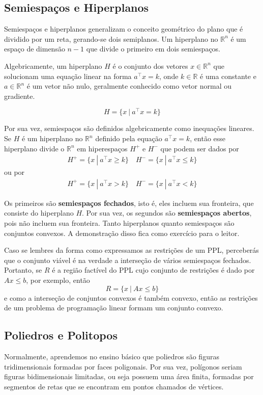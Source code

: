 \subsection{Semiespaços e Hiperplanos}
Semiespaços e hiperplanos generalizam o conceito geométrico do plano que é dividido por um reta, gerando-se dois semiplanos. Um hiperplano no $\mathbb{R}^n$ é um espaço de dimensão $n-1$ que divide o primeiro em dois semiespaços. 

Algebricamente, um hiperplano $H$ é o conjunto dos vetores $x \in \mathbb{R}^n$ que solucionam uma equação linear na forma $a^\top x = k$, onde $k \in \mathbb{R}$ é uma constante e $a \in \mathbb{R}^n$ é um vetor não nulo, geralmente conhecido como vetor normal ou gradiente.

\begin{equation*}
	H = \{x\ |\ a^\intercal x = k\}
\end{equation*} 

Por sua vez, semiespaços são definidos algebricamente como inequações lineares. Se $H$ é um hiperplano no $\mathbb{R}^n$ definido pela equação $a^\intercal x = k$, então esse hiperplano divide o $\mathbb{R}^n$ em hiperespaços $H^+$ e $H^-$ que podem ser dados por
\begin{align*}
	H^+ = \{x \ |\ a^\intercal x  \geq k\} \quad
	H^- = \{x \ |\ a^\intercal x  \leq k\} 
\end{align*}
ou por
\begin{align*}
	H^+ = \{x \ |\ a^\intercal x  > k\} \quad
	H^- = \{x \ |\ a^\intercal x  < k\} 
\end{align*}

Os primeiros são \textbf{semiespaços fechados}, isto é, eles incluem sua fronteira, que consiste do hiperplano $H$. Por sua vez, os segundos são \textbf{semiespaços abertos}, pois não incluem sua fronteira. Tanto hiperplanos quanto semiespaços são conjuntos convexos. A demonstração disso fica como exercício para o leitor.

Caso se lembres da forma como expressamos as restrições de um PPL, perceberás que o conjunto viável é na verdade a interseção de vários semiespaços fechados. Portanto, se $R$ é a região factível do PPL cujo conjunto de restrições é dado por $Ax \leq b$, por exemplo, então 
\[R = \{x \ | \ Ax \leq b\}\]
e como a interseção de conjuntos convexos é também convexo, então as restrições de um problema de programação linear formam um conjunto convexo.

\subsection{Poliedros e Politopos}
Normalmente, aprendemos no ensino básico que poliedros são figuras tridimensionais formadas por faces poligonais. Por sua vez, polígonos seriam figuras bidimensionais limitadas, ou seja possuem uma área finita, formadas por segmentos de retas que se encontram em pontos chamados de vértices.

